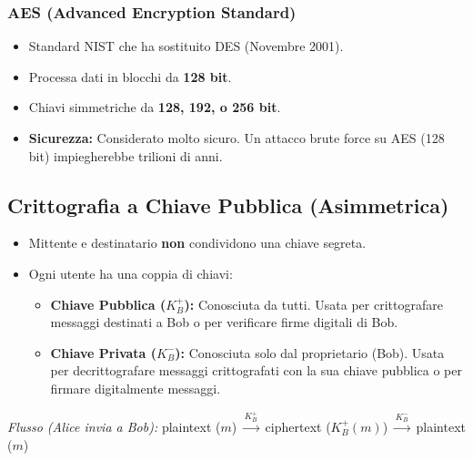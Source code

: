 \subsubsection{AES (Advanced Encryption Standard)}
\begin{itemize}
    \item Standard NIST che ha sostituito DES (Novembre 2001).
    \item Processa dati in blocchi da \textbf{128 bit}.
    \item Chiavi simmetriche da \textbf{128, 192, o 256 bit}.
    \item \textbf{Sicurezza:} Considerato molto sicuro. Un attacco brute force su AES (128 bit) impiegherebbe trilioni di anni.
\end{itemize}

\subsection{Crittografia a Chiave Pubblica (Asimmetrica)}
\begin{itemize}
    \item Mittente e destinatario \textbf{non} condividono una chiave segreta.
    \item Ogni utente ha una coppia di chiavi:
    \begin{itemize}
        \item \textbf{Chiave Pubblica ($K_B^+$):} Conosciuta da tutti. Usata per crittografare messaggi destinati a Bob o per verificare firme digitali di Bob.
        \item \textbf{Chiave Privata ($K_B^-$):} Conosciuta solo dal proprietario (Bob). Usata per decrittografare messaggi crittografati con la sua chiave pubblica o per firmare digitalmente messaggi.
    \end{itemize}
\end{itemize}
\textit{Flusso (Alice invia a Bob):} plaintext ($m$) $\xrightarrow{K_B^+}$ ciphertext ($K_B^+(m)$) $\xrightarrow{K_B^-}$ plaintext ($m$)

